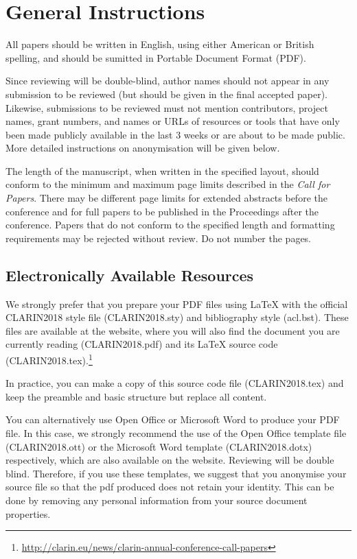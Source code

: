\documentclass{clarin}
\begin{document}

\section{General Instructions}

All papers should be written in English, using either American or British spelling, and should be sumitted in Portable Document Format (PDF).

Since reviewing will be double-blind, author names should not appear in any submission to be reviewed (but should be given in the final accepted paper).
Likewise, submissions to be reviewed must not mention contributors, project names, grant numbers, and names or URLs of resources or tools that have only been made publicly available in
the last 3 weeks or are about to be made public.
More detailed instructions on anonymisation will be given below.

The length of the manuscript, when written in the specified layout,
should conform to the minimum and maximum page limits described in the \emph{Call for Papers}.
There may be different page limits for extended abstracts before the conference and for full papers to be published in the Proceedings after the conference.
Papers that do not conform to the specified length and formatting requirements may be rejected without review.
Do not number the pages.


\subsection{Electronically Available Resources}

We strongly prefer that you prepare your PDF files using LaTeX with
the official CLARIN2018 style file (CLARIN2018.sty) and bibliography style
(acl.bst). These files are available at the website, where you will also find the document
you are currently reading (CLARIN2018.pdf) and its LaTeX source code
(CLARIN2018.tex).\footnote{\url{http://clarin.eu/news/clarin-annual-conference-call-papers}}

In practice, you can make a copy of this source code file (CLARIN2018.tex) and keep the preamble and basic structure but replace all content.

You can alternatively use Open Office or Microsoft Word to produce your PDF file.
In this case, we strongly recommend the use of the Open Office template file
(CLARIN2018.ott) or the Microsoft Word template
(CLARIN2018.dotx) respectively, which are also available on the website.
Reviewing will be double blind.
Therefore, if you use these templates, we suggest that you anonymise
  your source file so that the pdf produced does not retain your
  identity.  This can be done by removing any personal information
from your source document properties.
\end{document}
